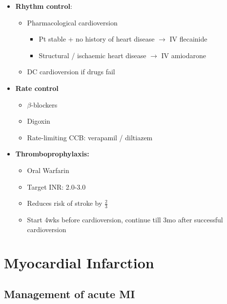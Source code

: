 \documentclass[
  12pt,
]{memoir}
\providecommand{\tightlist}{%
  \setlength{\itemsep}{0pt}\setlength{\parskip}{0pt}}
\begin{document}
\begin{itemize}
\tightlist
\item
  \textbf{Rhythm control}:

  \begin{itemize}
  \tightlist
  \item
    Pharmacological cardioversion

    \begin{itemize}
    \tightlist
    \item
      Pt stable + no history of heart disease \(\rightarrow\) IV
      flecainide
    \item
      Structural / ischaemic heart disease \(\rightarrow\) IV amiodarone
    \end{itemize}
  \item
    DC cardioversion if drugs fail
  \end{itemize}
\item
  \textbf{Rate control}

  \begin{itemize}
  \tightlist
  \item
    \(\beta\)-blockers
  \item
    Digoxin
  \item
    Rate-limiting CCB: verapamil / diltiazem
  \end{itemize}
\item
  \textbf{Thromboprophylaxis:}

  \begin{itemize}
  \tightlist
  \item
    Oral Warfarin
  \item
    Target INR: 2.0-3.0
  \item
    Reduces risk of stroke by \(\frac{2}{3}\)
  \item
    Start 4wks before cardioversion, continue till 3mo after successful
    cardioversion
  \end{itemize}
\end{itemize}

\pagebreak

\hypertarget{myocardial-infarction-1}{%
\section{Myocardial Infarction}\label{myocardial-infarction-1}}

\hypertarget{management-of-acute-mi}{%
\subsection{Management of acute MI}\label{management-of-acute-mi}}
\end{document}
